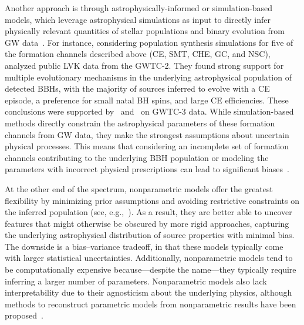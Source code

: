 \begin{refsection}
Another approach is through astrophysically-informed or simulation-based models, which leverage astrophysical simulations as input to directly infer physically relevant quantities of stellar populations and binary evolution from \ac{GW} data~\citep{Barrett:2016edh, Taylor:2018iat, Wong:2020ise, Mould:2022ccw, Riley:2023jep, Leyde:2023iof, Mastrogiovanni:2022ykr, Zevin:2020gbd, Cheng:2023ddt, Colloms:2025hib, Neijssel:2019irh, Bouffanais:2020qds, Plunkett:2025mjr}. For instance, considering population synthesis simulations for five of the formation channels described above (\ac{CE}, \ac{SMT}, \ac{CHE}, \ac{GC}, and \ac{NSC}), \citet{Zevin:2020gbd} analyzed public \acs{LVK} data from the \ac{GWTC-2}. They found strong support for multiple evolutionary mechanisms in the underlying astrophysical population of detected \acp{BBH}, with the majority of sources inferred to evolve with a \ac{CE} episode, a preference for small natal \ac{BH} spins, and large  \ac{CE} efficiencies. These conclusions were supported by~\citet{Cheng:2023ddt} and~\citet{Colloms:2025hib} on \acs{GWTC-3} data. While simulation-based methods directly constrain the astrophysical parameters of these formation channels from \ac{GW} data, they make the strongest assumptions about uncertain physical processes. This means that considering an incomplete set of formation channels contributing to the underlying \ac{BBH} population or modeling the parameters with incorrect physical prescriptions can lead to significant biases~\citep{Cheng:2023ddt}. 

At the other end of the spectrum, nonparametric models offer the greatest flexibility by minimizing prior assumptions and avoiding restrictive constraints on the inferred population (see, e.g.,~\citet{Heinzel:2024jlc, Edelman:2022ydv, Godfrey:2023oxb, Golomb:2022bon, Heinzel:2023hlb, Tiwari:2020vym, Rinaldi:2021bhm, Callister:2023tgi, Li:2021ukd, Ray:2023upk, Farah:2024xub, Toubiana:2023egi,Sadiq:2023zee,Sadiq:2025aog,Sadiq:2025vly,Mandel:2016prl}). 
As a result, they are better able to uncover features that might otherwise be obscured by more rigid approaches, capturing the underlying astrophysical distribution of source properties with minimal bias. The downside is a bias--variance tradeoff, in that these models typically come with larger statistical uncertainties. Additionally, nonparametric models tend to be computationally expensive because---despite the name---they typically require inferring a larger number of parameters. Nonparametric models also lack interpretability due to their agnosticism about the underlying physics, although methods to reconstruct parametric models from nonparametric results have been proposed~\citep{Fabbri:2025faf,Rinaldi:2025evs}. 


\end{refsection}

